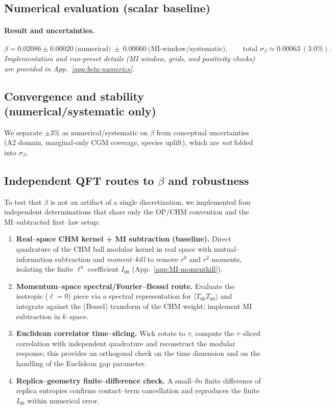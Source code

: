 \documentclass[aps,prd,onecolumn,superscriptaddress,nofootinbib]{revtex4-2}
\begin{document}
\subsection{Numerical evaluation (scalar baseline)}
\paragraph*{Result and uncertainties.}
\begin{equation}
\beta = 0.02086 \pm 0.00020\ \text{(numerical)} \ \pm\ 0.00060\ \text{(MI-window/systematic)},\qquad \text{total }\sigma_\beta \simeq 0.00063~(3.0\%).
\end{equation}
\emph{Implementation and run-preset details (MI window, grids, and positivity checks) are provided in App.~\ref{app:beta-numerics}.}

\subsection{Convergence and stability (numerical/systematic only)}
\label{sec:convergence}
We separate $\pm3\%$ as numerical/systematic on $\beta$ from conceptual uncertainties (A2 domain, marginal-only CGM coverage, species uplift), which are \emph{not} folded into $\sigma_\beta$.

\subsection{Independent QFT routes to \texorpdfstring{$\beta$}{beta} and robustness}
\label{sec:beta-multimethod}
To test that $\beta$ is not an artifact of a single discretization, we implemented four independent determinations that share only the OP/CHM convention and the MI–subtracted first–law setup:

\begin{enumerate}[leftmargin=1.3em,label=(\alph*)]
\item \textbf{Real–space CHM kernel + MI subtraction (baseline).} Direct quadrature of the CHM ball modular kernel in real space with mutual–information subtraction and \emph{moment–kill} to remove $r^0$ and $r^2$ moments, isolating the finite $\ell^4$ coefficient $I_{00}$ (App.~\ref{app:MI-momentkill}).

\item \textbf{Momentum–space spectral/Fourier–Bessel route.} Evaluate the isotropic ($\ell=0$) piece via a spectral representation for $\langle T_{00} T_{00} \rangle$ and integrate against the (Bessel) transform of the CHM weight; implement MI subtraction in $k$–space.

\item \textbf{Euclidean correlator time–slicing.} Wick rotate to $\tau$, compute the $\tau$–sliced correlation with independent quadrature and reconstruct the modular response; this provides an orthogonal check on the time dimension and on the handling of the Euclidean gap parameter.

\item \textbf{Replica–geometry finite–difference check.} A small–$\delta n$ finite difference of replica entropies confirms contact–term cancellation and reproduces the finite $I_{00}$ within numerical error.
\end{enumerate}
\end{document}
